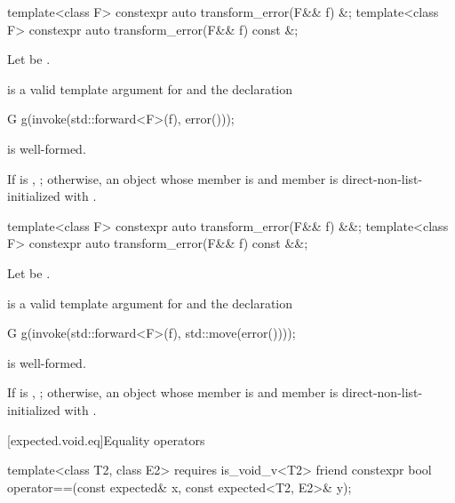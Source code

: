 %
\begin{itemdecl}
template<class F> constexpr auto transform_error(F&& f) &;
template<class F> constexpr auto transform_error(F&& f) const &;
\end{itemdecl}

\begin{itemdescr}
\pnum
Let  be .

\pnum
\mandates
{} is a valid template argument
for  and the declaration
\begin{codeblock}
G g(invoke(std::forward<F>(f), error()));
\end{codeblock}
is well-formed.

\pnum
\returns
If  is , ; otherwise, an
 object whose  member is 
and  member is direct-non-list-initialized with
.
\end{itemdescr}

%
\begin{itemdecl}
template<class F> constexpr auto transform_error(F&& f) &&;
template<class F> constexpr auto transform_error(F&& f) const &&;
\end{itemdecl}

\begin{itemdescr}
\pnum
Let  be
.

\pnum
\mandates
{} is a valid template argument
for  and the declaration
\begin{codeblock}
G g(invoke(std::forward<F>(f), std::move(error())));
\end{codeblock}
is well-formed.

\pnum
\returns
If  is , ; otherwise, an
 object whose  member is 
and  member is direct-non-list-initialized with
.
\end{itemdescr}

[expected.void.eq]{Equality operators}

%
\begin{itemdecl}
template<class T2, class E2> requires is_void_v<T2>
  friend constexpr bool operator==(const expected& x, const expected<T2, E2>& y);
\end{itemdecl}

